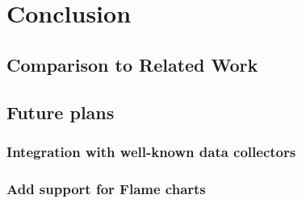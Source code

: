 \chapter{Conclusion}
\section{Comparison to Related Work}
\section{Future plans}
\subsection{Integration with well-known data collectors}
\subsection{Add support for Flame charts}